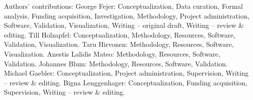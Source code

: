 \documentclass[pdflatex,sn-basic,lineno]{sn-jnl}
\begin{document}
Authors' contributions: George Fejer: Conceptualization, Data curation, Formal analysis, Funding acquisition, Investigation, Methodology, Project administration, Software, Validation, Visualization, Writing -- original draft, Writing -- review \& editing. Till Holzapfel: Conceptualization, Methodology, Resources, Software, Validation, Visualization. Taru Hirvonen: Methodology, Resources, Software, Visualization. Anestis Lalidis Mateo: Methodology, Resources, Software, Validation. Johannes Blum: Methodology, Resources, Software, Validation. Michael Gaebler: Conceptualization, Project administration, Supervision, Writing -- review \& editing. Bigna Lenggenhager: Conceptualization, Funding acquisition, Supervision, Writing -- review \& editing.


\end{document}
